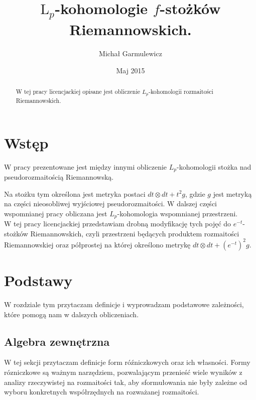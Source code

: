 \documentclass[licencjacka]{pracamgr}
\author{Michał Garmulewicz}
\title{$\mathrm{L}_p$-kohomologie $f$-stożków Riemannowskich.}
\date{Maj 2015}
\theoremstyle{definition}
\theoremstyle{definition}
\theoremstyle{plain}
\theoremstyle{plain}
\theoremstyle{plain}
\begin{document}
\maketitle

\begin{abstract}
  W tej pracy licencjackiej opisane jest obliczenie $L_p$-kohomologii
  rozmaitości Riemannowskich.
\end{abstract}

\tableofcontents

\chapter{Wstęp}

W pracy \cite{weber} prezentowane jest między innymi obliczenie
$L_p$-kohomologii stożka nad pseudorozmaitością Riemannowską. 

Na stożku tym określona jest metryka postaci
$dt \otimes dt + t^2 g$, gdzie $g$ 
jest metryką na części nieosobliwej wyjściowej pseudorozmaitości.
W dalszej części wspomnianej pracy obliczana jest $L_p$-kohomologia
wspomnianej przestrzeni.
\\


W tej pracy licencjackiej przedstawiam drobną modyfikację tych pojęć do
$e^{-t}$-stożków Riemannowskich, czyli przestrzeni będących produktem
rozmaitości Riemannowskiej oraz półprostej na której określono metrykę
$dt \otimes dt + (e^{-t})^2 g$. \\


\chapter{Podstawy}
W rozdziale tym przytaczam definicje i wyprowadzam podstawowe zależności, które
pomogą nam w dalszych obliczeniach. \\


\section{Algebra zewnętrzna}
W tej sekcji przytaczam definicje form róźniczkowych oraz ich własności. Formy
rózniczkowe są ważnym narzędziem, pozwalającym przenieść wiele wyników z
analizy rzeczywistej na rozmaitości tak, aby sformułowania nie były zależne od
wyboru konkretnych współrzędnych na rozważanej rozmaitości. \\
\end{document}
